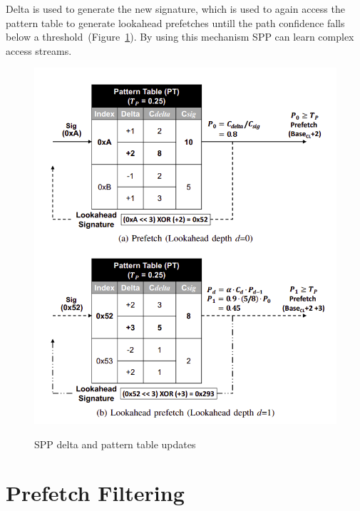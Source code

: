 Delta is used to generate the new signature, which is used to again access the pattern table to generate lookahead prefetches untill the path confidence falls below a threshold~(Figure~\ref{fig:spp2}). By using this mechanism SPP can learn complex access streams.
\begin{figure}[H]
{\includegraphics[scale=0.6]{images/SPP2.png}}
\caption{SPP delta and pattern table updates~\cite{SPP}}
\label{fig:spp2}
\end{figure}

\section{ Prefetch Filtering}

